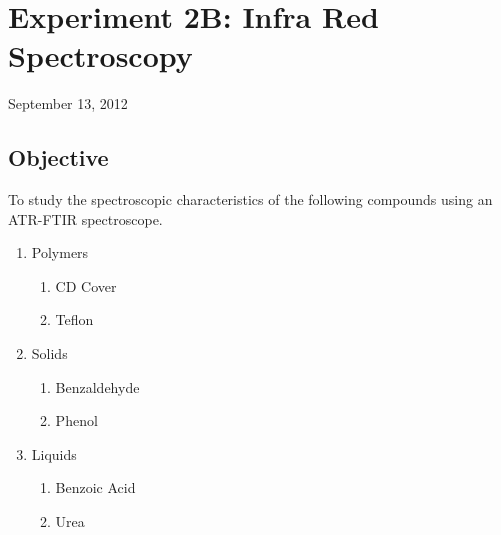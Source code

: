\chapter{Experiment 2B: Infra Red Spectroscopy \label{ATR_exp}}
\begin{flushright}
September 13, 2012
\end{flushright}

\section{Objective}
	To study the spectroscopic characteristics of the following compounds using an ATR-FTIR spectroscope.
	\begin{enumerate}
		\item Polymers
		\begin{enumerate}
			\item CD Cover
			\item Teflon		
		\end{enumerate}
		\item Solids
		\begin{enumerate}
			\item Benzaldehyde
			\item Phenol
		\end{enumerate}
		\item Liquids
		\begin{enumerate}
			\item Benzoic Acid
			\item Urea
		\end{enumerate}
	\end{enumerate}

